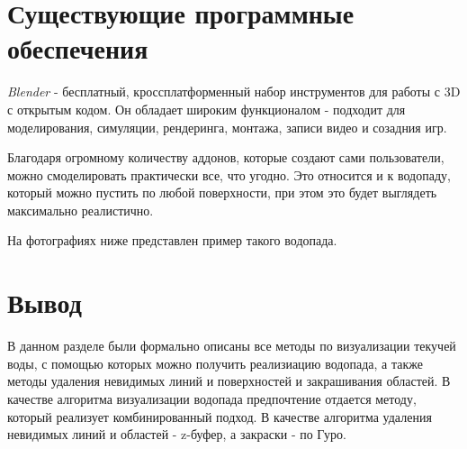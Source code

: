 \section{Существующие программные обеспечения}
\textit{Blender} - бесплатный, кроссплатформенный набор инструментов для работы с 3D с открытым кодом. Он обладает широким функционалом - подходит для моделирования, симуляции, рендеринга, монтажа, записи видео и созадния игр.

Благодаря огромному количеству аддонов, которые создают сами пользователи, можно смоделировать практически все, что угодно. Это относится и к водопаду, который можно пустить по любой поверхности, при этом это будет выглядеть максимально реалистично.

На фотографиях ниже представлен пример такого водопада.
\clearpage

\section*{Вывод}
В данном разделе были формально описаны все методы по визуализации текучей воды, с помощью которых можно получить реализиацию водопада, а также методы удаления невидимых линий и поверхностей и закрашивания областей. В качестве алгоритма визуализации водопада предпочтение отдается методу, который реализует комбинированный подход. В качестве алгоритма удаления невидимых линий и областей - z-буфер, а закраски - по Гуро.